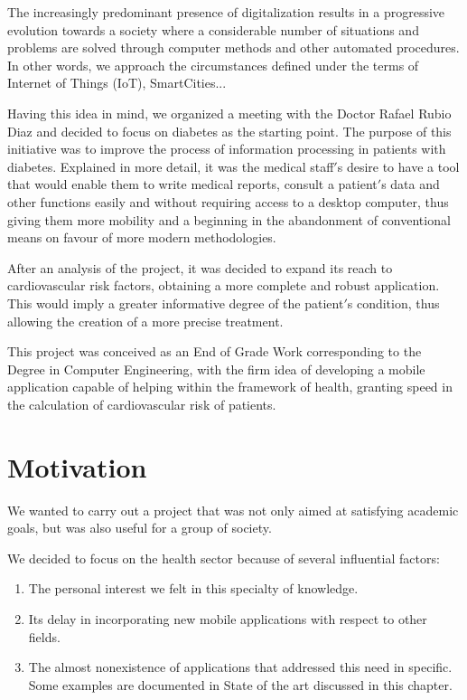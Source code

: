 \documentclass[11pt,spanish,
		listoftables,listoffigures]
		{tfgplantilla}
\begin{document}
The increasingly predominant presence of digitalization results in a progressive evolution towards a society where a considerable number of situations and problems are solved through computer methods and other automated procedures. In other words, we approach the circumstances defined under the terms of Internet of Things (IoT), SmartCities...

Having this idea in mind, we organized a meeting with the Doctor Rafael Rubio Diaz and decided to focus on diabetes as the starting point. The purpose of this initiative was to improve the process of information processing in patients with diabetes. Explained in more detail, it was the medical staff$'$s desire to have a tool that would enable them to write medical reports, consult a patient$'$s data and other functions easily and without requiring access to a desktop computer, thus giving them more mobility and a beginning in the abandonment of conventional means on favour of more modern methodologies.

After an analysis of the project, it was decided to expand its reach to cardiovascular risk factors, obtaining a more complete and robust application. This would imply a greater informative degree of the patient$'$s condition, thus allowing the creation of a more precise treatment.

This project was conceived as an End of Grade Work corresponding to the Degree in Computer Engineering, with the firm idea of developing a mobile application capable of helping within the framework of health, granting speed in the calculation of cardiovascular risk of patients.

\section{Motivation}

We wanted to carry out a project that was not only aimed at satisfying academic goals, but was also useful for a group of society.

We decided to focus on the health sector because of several influential factors:

\begin{enumerate}
	\item The personal interest we felt in this specialty of knowledge.

	\item Its delay in incorporating new mobile applications with respect to other fields.

	\item The almost nonexistence of applications that addressed this need in specific. Some examples are documented in \textquotedbl State of the art \textquotedbl {} discussed in this chapter.
\end{enumerate}
\end{document}
